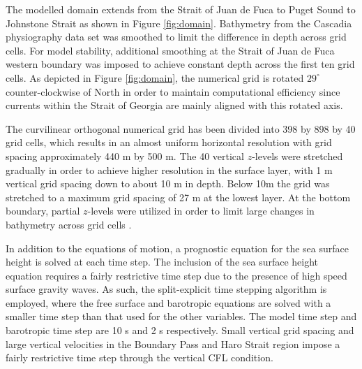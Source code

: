 \documentclass[pdftex,10pt]{article}
\begin{document}
The modelled domain extends from the Strait of Juan de Fuca to Puget Sound to Johnstone Strait as shown in Figure \ref{fig:domain}. Bathymetry from the Cascadia physiography data set \citep{haugerud1999digital} was smoothed to limit the difference in depth across grid cells. For model stability, additional smoothing at the Strait of Juan de Fuca western boundary was imposed to achieve constant depth across the first ten grid cells. As depicted in Figure \ref{fig:domain}, the numerical grid is rotated $29^{\circ}$ counter-clockwise of North in order to maintain computational efficiency since currents within the Strait of Georgia are mainly aligned with this rotated axis. 

The curvilinear orthogonal numerical grid has been divided into 398 by 898 by 40 grid cells, which results in an almost uniform horizontal resolution with grid spacing approximately 440 m by 500 m. The 40 vertical $z$-levels were stretched gradually in order to achieve higher resolution in the surface layer, with 1 m vertical grid spacing down to about 10 m in depth. Below 10m the grid was stretched to a maximum grid spacing of 27 m at the lowest layer. At the bottom boundary, partial $z$-levels were utilized in order to limit large changes in bathymetry across grid cells \citep{madec2012nemo}. 

In addition to the equations of motion, a prognostic equation for the sea surface height is solved at each time step. The inclusion of the sea surface height equation requires a fairly restrictive time step due to the presence of high speed surface gravity waves. As such, the split-explicit time stepping algorithm is employed, where the free surface and barotropic equations are solved with a smaller time step than that used for the other variables. The model time step and barotropic time step are 10 s and 2 s respectively. Small vertical grid spacing and large vertical velocities in the Boundary Pass and Haro Strait region impose a fairly restrictive time step through the vertical CFL condition.
\end{document}
